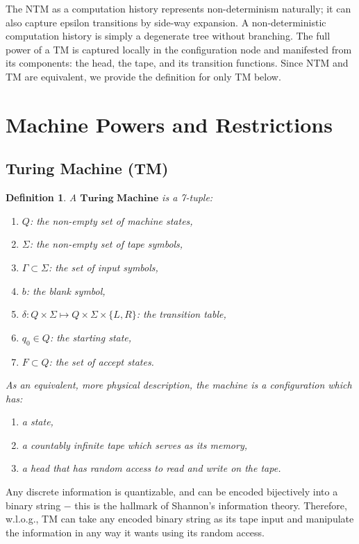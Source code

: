 \documentclass[12pt]{article}  %
\newtheorem{definition}{Definition}
\begin{document}
The NTM as a computation history represents non-determinism naturally; it can also capture epsilon transitions by side-way expansion. A non-deterministic computation history is simply a degenerate tree without branching. The full power of a TM is captured locally in the configuration node and manifested from its components: the head, the tape, and its transition functions. Since NTM and TM are equivalent, we provide the definition for only TM below.




\section{Machine Powers and Restrictions}

\subsection{Turing Machine (TM)}

\begin{definition}
A $\textbf{Turing Machine}$ is a 7-tuple:
\begin{enumerate}
	\item $Q$: the non-empty set of machine states,
	\item $\Sigma$: the non-empty set of tape symbols,
	\item $\Gamma \subset \Sigma$: the set of input symbols,
	\item $b$: the blank symbol,
	\item $\delta: Q \times \Sigma \mapsto Q \times \Sigma \times \{L, R\} $: the transition table,
	\item $q_0 \in Q$: the starting state,
	\item $F \subset Q$: the set of accept states.
\end{enumerate}

As an equivalent, more physical description, the machine is a configuration which has:
\begin{enumerate}
	\item a state,
	\item a countably infinite tape which serves as its memory,
	\item a head that has random access to read and write on the tape.
\end{enumerate}
\end{definition}


Any discrete information is quantizable, and can be encoded bijectively into a binary string $-$ this is the hallmark of Shannon's information theory. Therefore, w.l.o.g., TM can take any encoded binary string as its tape input and manipulate the information in any way it wants using its random access. 
\end{document}
